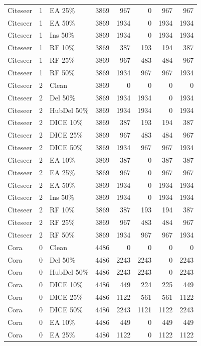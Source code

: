 {\begin{longtable}{lr l rrrrr}
Citeseer & 1 & EA 25\% & 3869 & 967 & 0 & 967 & 967 \\
Citeseer & 1 & EA 50\% & 3869 & 1934 & 0 & 1934 & 1934 \\
Citeseer & 1 & Ins 50\% & 3869 & 1934 & 0 & 1934 & 1934 \\
Citeseer & 1 & RF 10\% & 3869 & 387 & 193 & 194 & 387 \\
Citeseer & 1 & RF 25\% & 3869 & 967 & 483 & 484 & 967 \\
Citeseer & 1 & RF 50\% & 3869 & 1934 & 967 & 967 & 1934 \\
Citeseer & 2 & Clean & 3869 & 0 & 0 & 0 & 0 \\
Citeseer & 2 & Del 50\% & 3869 & 1934 & 1934 & 0 & 1934 \\
Citeseer & 2 & HubDel 50\% & 3869 & 1934 & 1934 & 0 & 1934 \\
Citeseer & 2 & DICE 10\% & 3869 & 387 & 193 & 194 & 387 \\
Citeseer & 2 & DICE 25\% & 3869 & 967 & 483 & 484 & 967 \\
Citeseer & 2 & DICE 50\% & 3869 & 1934 & 967 & 967 & 1934 \\
Citeseer & 2 & EA 10\% & 3869 & 387 & 0 & 387 & 387 \\
Citeseer & 2 & EA 25\% & 3869 & 967 & 0 & 967 & 967 \\
Citeseer & 2 & EA 50\% & 3869 & 1934 & 0 & 1934 & 1934 \\
Citeseer & 2 & Ins 50\% & 3869 & 1934 & 0 & 1934 & 1934 \\
Citeseer & 2 & RF 10\% & 3869 & 387 & 193 & 194 & 387 \\
Citeseer & 2 & RF 25\% & 3869 & 967 & 483 & 484 & 967 \\
Citeseer & 2 & RF 50\% & 3869 & 1934 & 967 & 967 & 1934 \\
Cora & 0 & Clean & 4486 & 0 & 0 & 0 & 0 \\
Cora & 0 & Del 50\% & 4486 & 2243 & 2243 & 0 & 2243 \\
Cora & 0 & HubDel 50\% & 4486 & 2243 & 2243 & 0 & 2243 \\
Cora & 0 & DICE 10\% & 4486 & 449 & 224 & 225 & 449 \\
Cora & 0 & DICE 25\% & 4486 & 1122 & 561 & 561 & 1122 \\
Cora & 0 & DICE 50\% & 4486 & 2243 & 1121 & 1122 & 2243 \\
Cora & 0 & EA 10\% & 4486 & 449 & 0 & 449 & 449 \\
Cora & 0 & EA 25\% & 4486 & 1122 & 0 & 1122 & 1122 \\

\end{longtable}}
